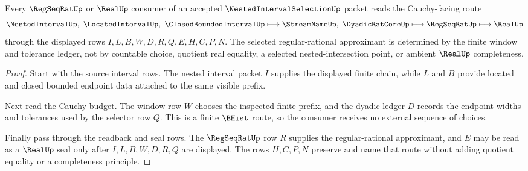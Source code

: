 \begin{theorem}
\label{thm:nested-interval-selection-cauchy-route}
Every $\RegSeqRatUp$ or $\RealUp$ consumer of an accepted $\NestedIntervalSelectionUp$ packet reads the Cauchy-facing route
$$
\NestedIntervalUp,\ \LocatedIntervalUp,\ \ClosedBoundedIntervalUp
\longmapsto
\StreamNameUp,\ \DyadicRatCoreUp
\longmapsto
\RegSeqRatUp
\longmapsto
\RealUp
$$
through the displayed rows $I,L,B,W,D,R,Q,E,H,C,P,N$. The selected regular-rational approximant is determined by the finite window and tolerance ledger, not by countable choice, quotient real equality, a selected nested-intersection point, or ambient $\RealUp$ completeness.
\end{theorem}
\begin{proof}
Start with the source interval rows. The nested interval packet $I$ supplies the displayed finite chain, while $L$ and $B$ provide located and closed bounded endpoint data attached to the same visible prefix.

Next read the Cauchy budget. The window row $W$ chooses the inspected finite prefix, and the dyadic ledger $D$ records the endpoint widths and tolerances used by the selector row $Q$. This is a finite $\BHist$ route, so the consumer receives no external sequence of choices.

Finally pass through the readback and seal rows. The $\RegSeqRatUp$ row $R$ supplies the regular-rational approximant, and $E$ may be read as a $\RealUp$ seal only after $I,L,B,W,D,R,Q$ are displayed. The rows $H,C,P,N$ preserve and name that route without adding quotient equality or a completeness principle.
\end{proof}

